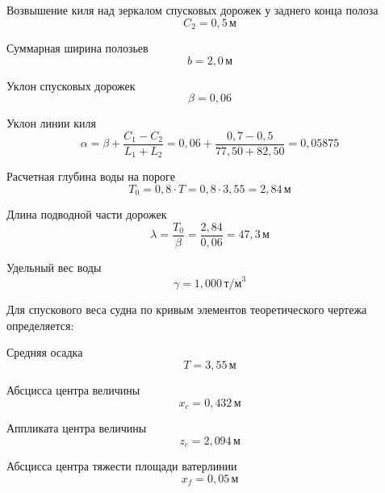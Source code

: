 Возвышение киля над зеркалом спусковых дорожек у заднего конца полоза
\begin{equation*}
    C_2 = 0{,}5\,\text{м}
\end{equation*}

Суммарная ширина полозьев
\begin{equation*}
    b = 2{,}0\,\text{м}
\end{equation*}

Уклон спусковых дорожек
\begin{equation*}
    \beta = 0{,}06
\end{equation*}

Уклон линии киля
\begin{equation*}
    \alpha = \beta + \frac{C_1 - C_2}{L_1 + L_2} = 0{,}06 + \frac{0{,}7 - 0{,}5}{77{,}50 + 82{,}50} = 0{,}05875
\end{equation*}

Расчетная глубина воды на пороге
\begin{equation*}
    T_0 = 0{,}8 \cdot T = 0{,}8 \cdot 3{,}55 = 2{,}84\,\text{м}
\end{equation*}

Длина подводной части дорожек
\begin{equation*}
    \lambda = \frac{T_0}{\beta} = \frac{2{,}84}{0{,}06} = 47{,}3\,\text{м}
\end{equation*}

Удельный вес воды
\begin{equation*}
    \gamma = 1{,}000\,\text{т/м}^3
\end{equation*}

Для спускового веса  судна по кривым элементов теоретического чертежа определяется:

Средняя осадка
\begin{equation*}
    T = 3{,}55\,\text{м}
\end{equation*}

Абсцисса центра величины
\begin{equation*}
    x_c = 0{,}432\,\text{м}
\end{equation*}

Аппликата центра величины
\begin{equation*}
    z_c = 2{,}094\,\text{м}
\end{equation*}

Абсцисса центра тяжести площади ватерлинии
\begin{equation*}
    x_f = 0{,}05\,\text{м}
\end{equation*}

